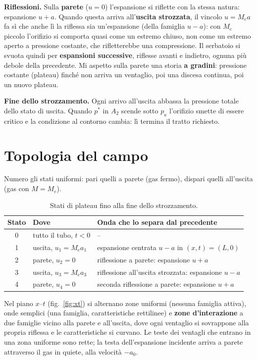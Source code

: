 \documentclass[11pt,a4paper]{article}
\newcommand{\uma}{u-a}
\newcommand{\upa}{u+a}
\begin{document}
\textbf{Riflessioni.} Sulla \textbf{parete} ($u=0$) l'espansione si riflette con la stessa natura: espansione
$\upa$. Quando questa arriva all'\textbf{uscita strozzata}, il vincolo $u=M_ea$ fa sì che anche lì la riflessa sia
un'espansione (della famiglia $\uma$): con $M_e$ piccolo l'orifizio si comporta quasi come un estremo chiuso, non
come un estremo aperto a pressione costante, che rifletterebbe una compressione. Il serbatoio si svuota quindi per
\textbf{espansioni successive}, riflesse avanti e indietro, ognuna più debole della precedente. Mi aspetto sulla
parete una storia \textbf{a gradini}: pressione costante (plateau) finché non arriva un ventaglio, poi una discesa
continua, poi un nuovo plateau.

\textbf{Fine dello strozzamento.} Ogni arrivo all'uscita abbassa la pressione totale dello stato di uscita.
Quando $p^*$ in $A_2$ scende sotto $p_a$ l'orifizio smette di essere critico e la condizione al contorno cambia:
lì termina il tratto richiesto.

\section{Topologia del campo}
Numero gli stati uniformi: pari quelli a parete (gas fermo), dispari quelli all'uscita (gas con $M=M_e$).

\begin{table}[H]
  \centering
  \small
  \begin{tabular}{clp{8.6cm}}
    \toprule
    Stato & Dove & Onda che lo separa dal precedente \\
    \midrule
    0 & tutto il tubo, $t<0$ & -- \\
    1 & uscita, $u_1=M_ea_1$ & espansione centrata $\uma$ in $(x,t)=(L,0)$ \\
    2 & parete, $u_2=0$ & riflessione a parete: espansione $\upa$ \\
    3 & uscita, $u_3=M_ea_3$ & riflessione all'uscita strozzata: espansione $\uma$ \\
    4 & parete, $u_4=0$ & seconda riflessione a parete: espansione $\upa$ \\
    \bottomrule
  \end{tabular}
  \caption{Stati di plateau fino alla fine dello strozzamento.}
\end{table}
Nel piano $x$--$t$ (fig.~\ref{fig:xt}) si alternano zone uniformi (nessuna famiglia attiva), onde semplici (una
famiglia, caratteristiche rettilinee) e \textbf{zone d'interazione} a due famiglie vicino alla parete e
all'uscita, dove ogni ventaglio si sovrappone alla propria riflessa e le caratteristiche si curvano. Le teste
dei ventagli che entrano in una zona uniforme sono rette; la testa dell'espansione incidente arriva a parete
attraverso il gas in quiete, alla velocità $-a_0$.
\end{document}
